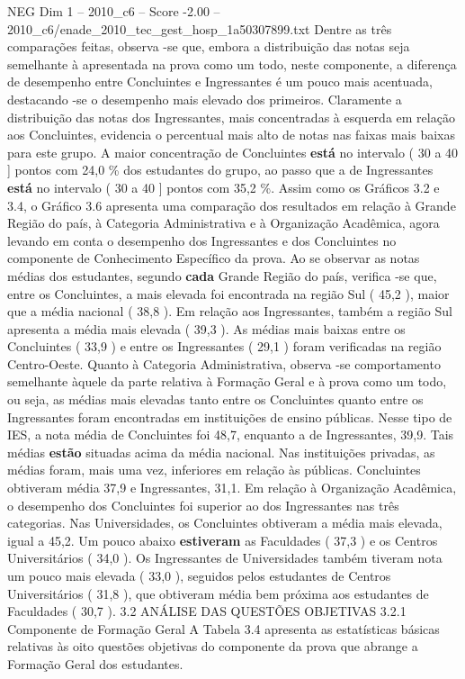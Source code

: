 \begin{textsample}{NEG Dim 1 – 2010\_c6 – Score -2.00 – 2010\_c6/enade\_2010\_tec\_gest\_hosp\_1a50307899.txt}
Dentre as três comparações feitas, observa -se que, embora a distribuição das notas seja semelhante à apresentada na prova como um todo, neste componente, a diferença de desempenho entre Concluintes e Ingressantes é um pouco mais acentuada, destacando -se o desempenho mais elevado dos primeiros.
Claramente a distribuição das notas dos Ingressantes, mais concentradas à esquerda em relação aos Concluintes, evidencia o percentual mais alto de notas nas faixas mais baixas para este grupo.
A maior concentração de Concluintes \textbf{está} no intervalo ( 30 a 40 ] pontos com 24,0 \% dos estudantes do grupo, ao passo que a de Ingressantes \textbf{está} no intervalo ( 30 a 40 ] pontos com 35,2 \%.
Assim como os Gráficos 3.2 e 3.4, o Gráfico 3.6 apresenta uma comparação dos resultados em relação à Grande Região do país, à Categoria Administrativa e à Organização Acadêmica, agora levando em conta o desempenho dos Ingressantes e dos Concluintes no componente de Conhecimento Específico da prova.
Ao se observar as notas médias dos estudantes, segundo \textbf{cada} Grande Região do país, verifica -se que, entre os Concluintes, a mais elevada foi encontrada na região Sul ( 45,2 ), maior que a média nacional ( 38,8 ).
Em relação aos Ingressantes, também a região Sul apresenta a média mais elevada ( 39,3 ).
As médias mais baixas entre os Concluintes ( 33,9 ) e entre os Ingressantes ( 29,1 ) foram verificadas na região Centro-Oeste.
Quanto à Categoria Administrativa, observa -se comportamento semelhante àquele da parte relativa à Formação Geral e à prova como um todo, ou seja, as médias mais elevadas tanto entre os Concluintes quanto entre os Ingressantes foram encontradas em instituições de ensino públicas.
Nesse tipo de IES, a nota média de Concluintes foi 48,7, enquanto a de Ingressantes, 39,9.
Tais médias \textbf{estão} situadas acima da média nacional.
Nas instituições privadas, as médias foram, mais uma vez, inferiores em relação às públicas.
Concluintes obtiveram média 37,9 e Ingressantes, 31,1.
Em relação à Organização Acadêmica, o desempenho dos Concluintes foi superior ao dos Ingressantes nas três categorias.
Nas Universidades, os Concluintes obtiveram a média mais elevada, igual a 45,2.
Um pouco abaixo \textbf{estiveram} as Faculdades ( 37,3 ) e os Centros Universitários ( 34,0 ).
Os Ingressantes de Universidades também tiveram nota um pouco mais elevada ( 33,0 ), seguidos pelos estudantes de Centros Universitários ( 31,8 ), que obtiveram média bem próxima aos estudantes de Faculdades ( 30,7 ). 3.2 ANÁLISE DAS QUESTÕES OBJETIVAS 3.2.1 Componente de Formação Geral A Tabela 3.4 apresenta as estatísticas básicas relativas às oito questões objetivas do componente da prova que abrange a Formação Geral dos estudantes.

\end{textsample}
